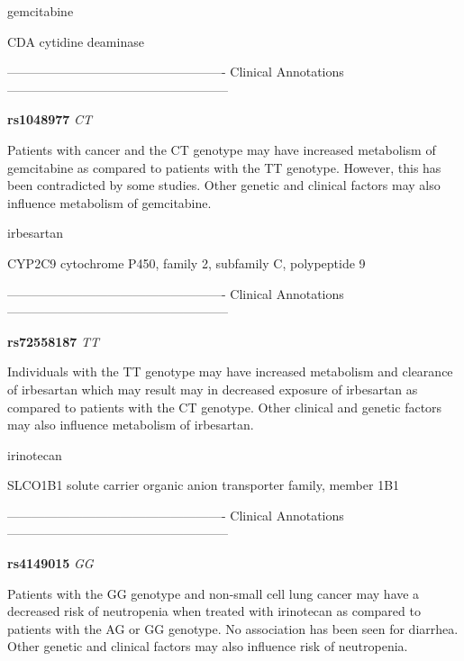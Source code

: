 \documentclass{resume} %
\begin{document}
\begin{rSection}{ gemcitabine }
\begin{rSubsection}{ CDA }{ cytidine deaminase }{}{}
\item[]

\item[] ---------------------------------------------------- Clinical Annotations -----------------------------------------------------\newline
\item \textbf{ rs1048977 } \textit{ CT }
\item[] Patients with cancer and the CT genotype may have increased metabolism of gemcitabine as compared to patients with the TT genotype. However, this has been contradicted by some studies. Other genetic and clinical factors may also influence metabolism of gemcitabine. 
\end{rSubsection}

\end{rSection}\begin{rSection}{ irbesartan }
\item[]

\begin{rSubsection}{ CYP2C9 }{ cytochrome P450, family 2, subfamily C, polypeptide 9 }{}{}
\item[]

\item[] ---------------------------------------------------- Clinical Annotations -----------------------------------------------------\newline
\item \textbf{ rs72558187 } \textit{ TT }
\item[] Individuals with the TT genotype may have increased metabolism and clearance of irbesartan which may result may in decreased exposure of irbesartan as compared to patients with the CT genotype. Other clinical and genetic factors may also influence metabolism of irbesartan.
\end{rSubsection}

\end{rSection}\begin{rSection}{ irinotecan }
\item[]

\begin{rSubsection}{ SLCO1B1 }{ solute carrier organic anion transporter family, member 1B1 }{}{}
\item[]

\item[] ---------------------------------------------------- Clinical Annotations -----------------------------------------------------\newline
\item \textbf{ rs4149015 } \textit{ GG }
\item[] Patients with the GG genotype and non-small cell lung cancer may have a decreased risk of neutropenia when treated with irinotecan as compared to patients with the AG or GG genotype. No association has been seen for diarrhea. Other genetic and clinical factors may also influence risk of neutropenia.
\end{rSubsection}


\end{rSection}
\end{document}
